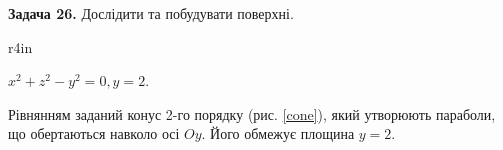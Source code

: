 \documentclass[14pt]{extreport}
\begin{document}
\pagestyle{empty}














\newpage




\newpage


\bigskip \textbf{Задача 26.} Дослідити та побудувати поверхні. \bigskip

\begin{wrapfigure}{r}{4in}
	\centering

\caption{конус, обмежений площиною $y=2$}
\label{cone}
\end{wrapfigure}

$x^2+z^2-y^2=0, y=2$.
\medskip

Рівнянням заданий конус 2-го порядку
(рис. \ref{cone}),
який утворюють параболи, що обертаються
навколо осі $Oy$. Його
обмежує площина $y=2$.

\end{document}
